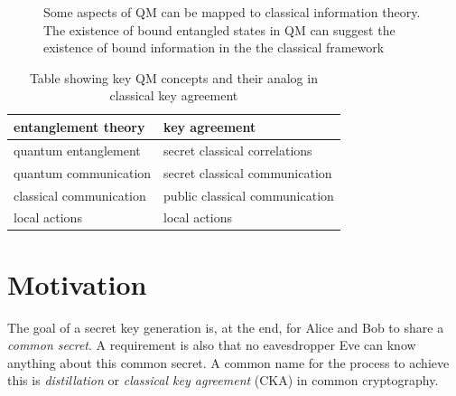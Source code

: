 

	\begin{figure}[H]
		\centering
		
		\caption{Some aspects of QM can be mapped to classical information theory. The existence of bound entangled states in QM can suggest the existence of bound information in the the classical framework }
	\end{figure}
	\begin{table}[ht]
	 \centering
	 	\begin{tabular}{ l | l}
	 		\textbf{entanglement theory} & \textbf{key agreement} \\ 
	 		\hline 
	 		quantum entanglement & secret classical correlations \\ 
	 		quantum communication & secret classical communication \\ 
	 		classical communication & public classical communication \\ 
	 		local actions & local actions \\ 
	 	\end{tabular} 
	 	\caption{Table showing key QM concepts and their analog in classical key agreement \cite{4H07}}
	 \end{table}
	
	
	\section{Motivation}
	
	The goal of a secret key generation is, at the end, for Alice and Bob to share a \emph{common secret}.  A requirement is also that no eavesdropper Eve can know anything about this common secret. A common name for the process to achieve this is \emph{distillation} or \emph{classical key agreement} (CKA) in common cryptography.
	
